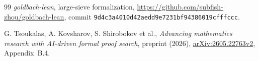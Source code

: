 \begin{thebibliography}{99}
\emph{goldbach-lean}, large-sieve formalization,
\url{https://github.com/subfish-zhou/goldbach-lean},
commit \nolinkurl{9d4c3a4010d42aedd9e7231bf94386019cfffccc}.

G. Tsoukalas, A. Kovsharov, S. Shirobokov et al.,
\emph{Advancing mathematics research with AI-driven formal
proof search},
preprint (2026),
\href{https://arxiv.org/abs/2605.22763v2}{arXiv:2605.22763v2},
Appendix~B.4.

\end{thebibliography}
